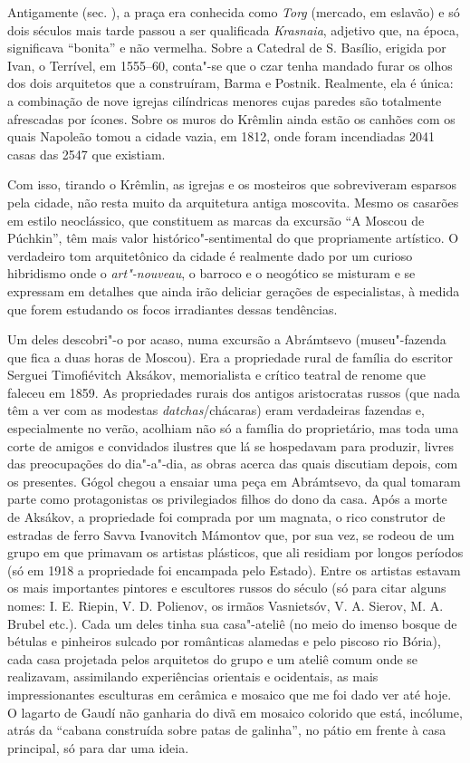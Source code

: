 Antigamente (sec. ), a praça era conhecida como \emph{Torg} (mercado,
em eslavão) e só dois séculos mais tarde passou a ser qualificada
\emph{Krasnaia}, adjetivo que, na época, significava ``bonita'' e não
vermelha. Sobre a Catedral de S. Basílio, erigida por Ivan, o Terrível, em
1555--60, conta"-se que o czar tenha mandado furar os olhos dos dois
arquitetos que a construíram, Barma e Postnik. Realmente, ela é única: a
combinação de nove igrejas cilíndricas menores cujas paredes são
totalmente afrescadas por ícones. Sobre os muros do Krêmlin ainda estão
os canhões com os quais Napoleão tomou a cidade vazia, em 1812, onde
foram incendiadas 2041 casas das 2547 que existiam.

Com isso, tirando o Krêmlin, as igrejas e os mosteiros que sobreviveram
esparsos pela cidade, não resta muito da arquitetura antiga moscovita.
Mesmo os casarões em estilo neoclássico, que constituem as marcas da
excursão ``A Moscou de Púchkin'', têm mais valor histórico"-sentimental
do que propriamente artístico. O verdadeiro tom arquitetônico da cidade
é realmente dado por um curioso hibridismo onde o \emph{art"-nouveau}, o
barroco e o neogótico se misturam e se expressam em detalhes que ainda
irão deliciar gerações de especialistas, à medida que forem estudando os
focos irradiantes dessas tendências.

Um deles descobri"-o por acaso, numa excursão a Abrámtsevo (museu"-fazenda
que fica a duas horas de Moscou). Era a propriedade rural de família do
escritor Serguei Timofiévitch Aksákov, memorialista e crítico teatral de
renome que faleceu em 1859. As propriedades rurais dos antigos
aristocratas russos (que nada têm a ver com as modestas
\emph{datchas}/chácaras) eram verdadeiras fazendas e, especialmente no
verão, acolhiam não só a família do proprietário, mas toda uma corte de
amigos e convidados ilustres que lá se hospedavam para produzir, livres
das preocupações do dia"-a"-dia, as obras acerca das quais discutiam
depois, com os presentes. Gógol chegou a ensaiar uma peça em Abrámtsevo,
da qual tomaram parte como protagonistas os privilegiados filhos do dono
da casa. Após a morte de Aksákov, a propriedade foi comprada por um
magnata, o rico construtor de estradas de ferro Savva Ivanovitch
Mámontov que, por sua vez, se rodeou de um grupo em que primavam os
artistas plásticos, que ali residiam por longos períodos (só em 1918 a
propriedade foi encampada pelo Estado). Entre os artistas estavam os
mais importantes pintores e escultores russos do século (só para citar
alguns nomes: I. E. Riepin, V. D. Polienov, os irmãos Vasnietsóv, V. A.
Sierov, M. A. Brubel etc.). Cada um deles tinha sua casa"-ateliê (no meio
do imenso bosque de bétulas e pinheiros sulcado por românticas alamedas
e pelo piscoso rio Bória), cada casa projetada pelos arquitetos do grupo
e um ateliê comum onde se realizavam, assimilando experiências orientais
e ocidentais, as mais impressionantes esculturas em cerâmica e mosaico
que me foi dado ver até hoje. O lagarto de Gaudí não ganharia do divã em
mosaico colorido que está, incólume, atrás da ``cabana construída sobre
patas de galinha'', no pátio em frente à casa principal, só para dar uma
ideia.

